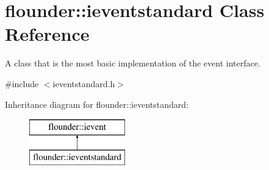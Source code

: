 \hypertarget{classflounder_1_1ieventstandard}{}\section{flounder\+:\+:ieventstandard Class Reference}
\label{classflounder_1_1ieventstandard}


A class that is the most basic implementation of the event interface.  




{\ttfamily \#include $<$ieventstandard.\+h$>$}

Inheritance diagram for flounder\+:\+:ieventstandard\+:\begin{figure}[H]
\begin{center}
\leavevmode
\includegraphics[height=2.000000cm]{classflounder_1_1ieventstandard}
\end{center}
\end{figure}
